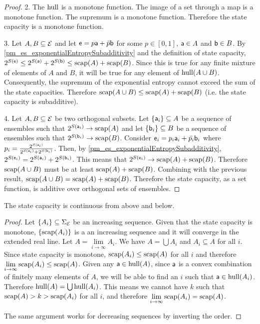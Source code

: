 \begin{mathSection}
\begin{proof}
	2. The $\hull$ is a monotone function. The image of a set through a map is a monotone function. The supremum is a monotone function. Therefore the state capacity is a monotone function.
	
	3. Let $A, B \subseteq \Ens$ and let $\ens = p \ens[a] + \bar{p} \ens[b]$ for some $p \in [0,1]$, $\ens[a] \in A$ and $\ens[b] \in B$. By \ref{pm_es_exponentialEntropySubadditivity} and the definition of state capacity, $2^{S(\ens)} \leq 2^{S(\ens[a])} + 2^{S(\ens[b])} \leq \scap(A) + \scap(B)$. Since this is true for any finite mixture of elements of $A$ and $B$, it will be true for any element of $\hull(A \cup B)$. Consequently, the supremum of the exponential entropy cannot exceed the sum of the state capacities. Therefore $\scap(A \cup B) \leq \scap(A) + \scap(B)$ (i.e. the state capacity is subadditive).
	
	4. Let $A, B \subseteq \Ens$ be two orthogonal subsets. Let $\{\ens[a]_i\} \subseteq A$ be a sequence of ensembles such that $2^{S(\ens[a]_i)} \to \scap(A)$ and let $\{\ens[b]_i\} \subseteq B$ be a sequence of ensembles such that $2^{S(\ens[b]_i)} \to \scap(B)$. Consider $\ens_i = p_i \ens[a]_i + \bar{p_i} \ens[b]_i$ where $p_i = \frac{2^{S(\ens[a]_i)}}{2^{S(\ens[a]_i)} + 2^{S(\ens[b]_i)}}$. Then, by \ref{pm_es_exponentialEntropySubadditivity}, $2^{S(\ens_i)} = 2^{S(\ens[a]_i)} + 2^{S(\ens[b]_i)}$. This means that $2^{S(\ens_i)} \to \scap(A) + \scap(B)$. Therefore $\scap(A \cup B)$ must be at least $\scap(A) + \scap(B)$. Combining with the previous result, $\scap(A \cup B) = \scap(A) + \scap(B)$. Therefore the state capacity, as a set function, is additive over orthogonal sets of ensembles.
\end{proof}

\begin{prop}
	The state capacity is continuous from above and below.
\end{prop}

\begin{proof}
	Let $\{A_i\} \subseteq \Sigma_{\Ens}$ be an increasing sequence. Given that the state capacity is monotone, $\{\scap(A_i)\}$ is a an increasing sequence and it will converge in the extended real line. Let $A = \lim\limits_{i \to \infty} A_i$. We have $A = \bigcup A_i$ and $A_i \subseteq A$ for all $i$. Since state capacity is monotone, $\scap(A_i) \leq \scap(A)$ for all $i$ and therefore $\lim\limits_{i \to \infty} \scap(A_i) \leq \scap(A)$. Given any $\ens[a] \in \hull(A)$, since $\ens[a]$ is a convex combination of finitely many elements of $A$, we will be able to find an $i$ such that $\ens[a] \in \hull(A_i)$. Therefore $\hull(A) = \bigcup \hull(A_i)$. This means we cannot have $k$ such that $\scap(A) > k > \scap(A_i)$ for all $i$, and therefore $\lim\limits_{i \to \infty} \scap(A_i) = \scap(A)$.
	
	The same argument works for decreasing sequences by inverting the order.
\end{proof}

\end{mathSection}

